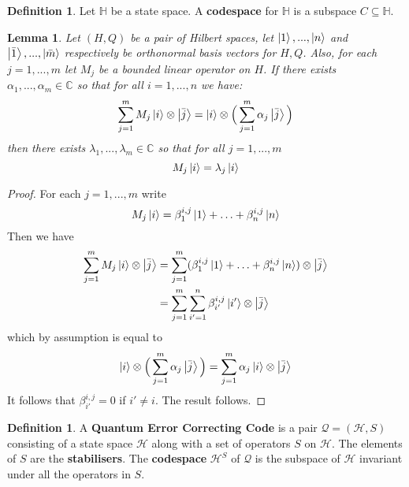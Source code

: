 \documentclass[12pt]{article}
\theoremstyle{plain}
\newtheorem{lemma}[thm]{Lemma}
\theoremstyle{definition}
\newtheorem{defn}[thm]{Definition} %
\newcommand{\bb}[1]{\mathbb{#1}}
\newcommand{\call}[1]{\mathcal{#1}}
\begin{document}
	\begin{defn}
		Let $\bb{H}$ be a state space. A \textbf{codespace} for $\bb{H}$ is a subspace $C \subseteq \bb{H}$.
	\end{defn}
\begin{lemma}\label{lem:operator_preliminary}
	Let $(H,Q)$ be a pair of Hilbert spaces, let $\ket{1},...,\ket{n}$ and $\ket{\bar{1}},...,\ket{\bar{m}}$ respectively be orthonormal basis vectors for $H,Q$. Also, for each $j = 1,...,m$ let $M_j$ be a bounded linear operator on $H$. If there exists $\alpha_1,...,\alpha_m \in \bb{C}$ so that for all $i = 1,...,n$ we have:
	\begin{equation}
		\sum_{j = 1}^mM_j\ket{i} \otimes \ket{\bar{j}} = \ket{i} \otimes \Big(\sum_{j= 1}^m \alpha_{j} \ket{\bar{j}}\Big)
	\end{equation}
	then there exists $\lambda_1,...,\lambda_m \in \bb{C}$ so that for all $j = 1,...,m$
	\begin{equation}
		M_j\ket{i} = \lambda_j \ket{i}
	\end{equation}
\end{lemma}
\begin{proof}
	For each $j = 1,...,m$ write
	\begin{equation}
		M_j\ket{i} = \beta^{i,j}_1\ket{1} + \hdots + \beta^{i,j}_n \ket{n}
	\end{equation}
	Then we have
	\begin{align*}
		\sum_{j = 1}^mM_j\ket{i} \otimes \ket{\bar{j}} &= \sum_{j = 1}^m(\beta^{i,j}_1\ket{1} + \hdots + \beta^{i,j}_n \ket{n}) \otimes \ket{\bar{j}}\\
		&= \sum_{j=1}^m\sum_{i' = 1}^n \beta_{i'}^{i,j} \ket{i'} \otimes \ket{\bar{j}}
	\end{align*}
	which by assumption is equal to
	\begin{equation}
		\ket{i} \otimes \Big(\sum_{j = 1}^m \alpha_{j} \ket{\bar{j}}\Big) = \sum_{j = 1}^m \alpha_j \ket{i} \otimes \ket{\bar{j}}
	\end{equation}
	It follows that $\beta_{i'}^{i,j} = 0$ if $i' \neq i$. The result follows.
\end{proof}

\begin{defn}
	A \textbf{Quantum Error Correcting Code} is a pair $\call{Q} = (\call{H}, S)$ consisting of a state space $\call{H}$ along with a set of operators $S$ on $\call{H}$. The elements of $S$ are the \textbf{stabilisers}. The \textbf{codespace} $\call{H}^S$ of $\call{Q}$ is the subspace of $\call{H}$ invariant under all the operators in $S$.
	\end{defn}
\end{document}
